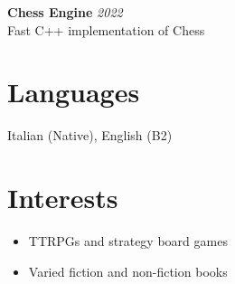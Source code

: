 \documentclass[a4paper,10pt]{article}
\begin{document}
\begin{minipage}[t]{0.33\textwidth}
        \textbf{Chess Engine} \hfill \textit{2022} \\
        Fast C++ implementation of Chess 
        

    \section*{Languages}
        Italian (Native), English (B2)

    \section*{Interests}
        \begin{itemize}[left=0.2cm, label={\textbullet}]
            \item TTRPGs and strategy board games
            \item Varied fiction and non-fiction books
        \end{itemize}

\end{minipage}
\hfill
\end{document}

